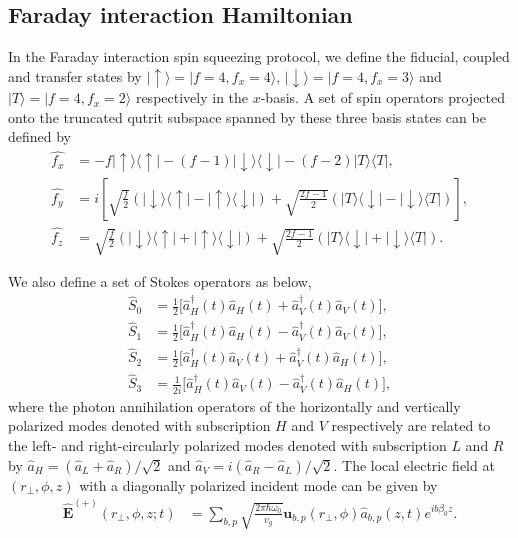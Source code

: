\documentclass[preprint,aps,pra,onecolumn,superscriptaddress]{revtex4-1} %
\def\bra#1{\langle{#1}\rvert}%
\def\ket#1{\lvert{#1}\rangle}%
\newcommand{\smallfrac}[2]{\mbox{$\frac{#1}{#2}$}}
\begin{document}
\begin{appendix}

\section{Faraday interaction Hamiltonian} \label{Appendix::FaradayInteractionHamiltonian}
In the Faraday interaction spin squeezing protocol, we define the fiducial, coupled and transfer states by $ \ket{\uparrow}=\ket{f=4,f_x=4} $, $ \ket{\downarrow}=\ket{f=4,f_x=3} $ and $ \ket{T}=\ket{f=4,f_x=2} $ respectively in the $ x $-basis. 
A set of spin operators projected onto the truncated qutrit subspace spanned by these three basis states can be defined by
\begin{align}
\hat{f_x} &= -f \ket{\uparrow}\bra{\uparrow} -(f-1)\ket{\downarrow}\bra{\downarrow}-(f-2)\ket{T}\bra{T},\\
\hat{f_y} &=i\left[\sqrt{\frac{f}{2}}\left(\ket{\downarrow}\bra{\uparrow}-\ket{\uparrow}\bra{\downarrow}\right) +\sqrt{\frac{2f-1}{2}}\left(\ket{T}\bra{\downarrow}-\ket{\downarrow}\bra{T} \right) \right] ,\\
\hat{f_z} &= \sqrt{\frac{f}{2}}\left(\ket{\downarrow}\bra{\uparrow}+\ket{\uparrow}\bra{\downarrow}\right) +\sqrt{\frac{2f-1}{2}}\left(\ket{T}\bra{\downarrow}+\ket{\downarrow}\bra{T} \right).
\end{align}

We also define a set of Stokes operators as below,
\begin{align}
\hat{S}_0 &= \smallfrac{1}{2}\big[ \hat{a}^\dag_H(t) \hat{a}_H(t)+\hat{a}^\dag_V(t) \hat{a}_V(t) \big],\\
\hat{S}_1 &= \smallfrac{1}{2}\big[ \hat{a}^\dag_H(t) \hat{a}_H(t)-\hat{a}^\dag_V(t) \hat{a}_V(t) \big],\\
\hat{S}_2 &= \smallfrac{1}{2}\big[ \hat{a}^\dag_H(t) \hat{a}_V(t)+\hat{a}^\dag_V(t) \hat{a}_H(t) \big],\\
\hat{S}_3 &= \smallfrac{1}{2i}\big[ \hat{a}^\dag_H(t) \hat{a}_V(t) -\hat{a}^\dag_V(t) \hat{a}_H(t) \big],
\end{align}
where the photon annihilation operators of the horizontally and vertically polarized modes denoted with subscription $ H $ and $ V $ respectively are related to the left- and right-circularly polarized modes denoted with subscription $ L $ and $ R $ by $ \hat{a}_{H}=(\hat{a}_L+\hat{a}_R) /\sqrt{2}$ and $ \hat{a}_{V}=i(\hat{a}_R-\hat{a}_L)/\sqrt{2} $.
The local electric field at $ (r\!_\perp,\phi,z) $ with a diagonally polarized incident mode can be given by
\begin{align}
\hat{\mathbf{E}}^{(+)}(r\!_\perp,\phi,z;t) &= \sum_{b,p} \sqrt{ \frac{2 \pi \hbar \omega_0}{ v_g} } \mathbf{u}_{b,p}(r\!_\perp,\phi) \hat{a}_{b,p}(z,t)  e^{i b \beta_0 z}.
\end{align}


\end{appendix}
\end{document}

